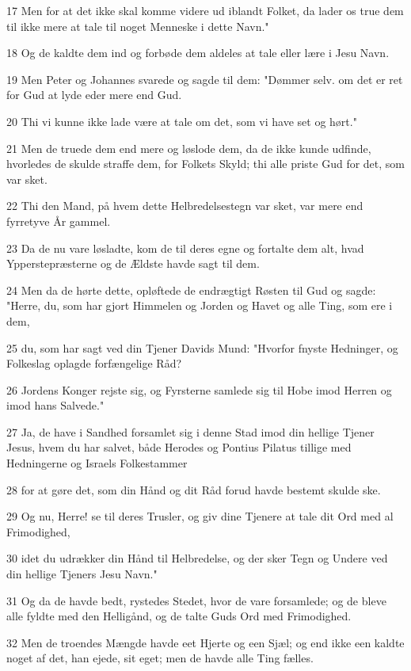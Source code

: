 \par 17 Men for at det ikke skal komme videre ud iblandt Folket, da lader os true dem til ikke mere at tale til noget Menneske i dette Navn."
\par 18 Og de kaldte dem ind og forbøde dem aldeles at tale eller lære i Jesu Navn.
\par 19 Men Peter og Johannes svarede og sagde til dem: "Dømmer selv. om det er ret for Gud at lyde eder mere end Gud.
\par 20 Thi vi kunne ikke lade være at tale om det, som vi have set og hørt."
\par 21 Men de truede dem end mere og løslode dem, da de ikke kunde udfinde, hvorledes de skulde straffe dem, for Folkets Skyld; thi alle priste Gud for det, som var sket.
\par 22 Thi den Mand, på hvem dette Helbredelsestegn var sket, var mere end fyrretyve År gammel.
\par 23 Da de nu vare løsladte, kom de til deres egne og fortalte dem alt, hvad Ypperstepræsterne og de Ældste havde sagt til dem.
\par 24 Men da de hørte dette, opløftede de endrægtigt Røsten til Gud og sagde: "Herre, du, som har gjort Himmelen og Jorden og Havet og alle Ting, som ere i dem,
\par 25 du, som har sagt ved din Tjener Davids Mund: "Hvorfor fnyste Hedninger, og Folkeslag oplagde forfængelige Råd?
\par 26 Jordens Konger rejste sig, og Fyrsterne samlede sig til Hobe imod Herren og imod hans Salvede."
\par 27 Ja, de have i Sandhed forsamlet sig i denne Stad imod din hellige Tjener Jesus, hvem du har salvet, både Herodes og Pontius Pilatus tillige med Hedningerne og Israels Folkestammer
\par 28 for at gøre det, som din Hånd og dit Råd forud havde bestemt skulde ske.
\par 29 Og nu, Herre! se til deres Trusler, og giv dine Tjenere at tale dit Ord med al Frimodighed,
\par 30 idet du udrækker din Hånd til Helbredelse, og der sker Tegn og Undere ved din hellige Tjeners Jesu Navn."
\par 31 Og da de havde bedt, rystedes Stedet, hvor de vare forsamlede; og de bleve alle fyldte med den Helligånd, og de talte Guds Ord med Frimodighed.
\par 32 Men de troendes Mængde havde eet Hjerte og een Sjæl; og end ikke een kaldte noget af det, han ejede, sit eget; men de havde alle Ting fælles.
